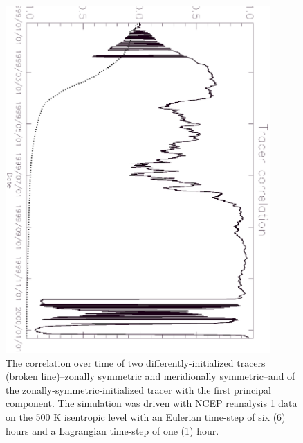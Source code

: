 \begin{figure}
\begin{center}
\includegraphics[angle=90,width=0.9\textwidth]{tcorr.eps}
\caption{The correlation over time of two differently-initialized tracers
(broken line)--zonally symmetric and meridionally symmetric--and of
the zonally-symmetric-initialized tracer with the first principal component.
The simulation was driven with NCEP reanalysis 1 data on the 500 K isentropic
level with an Eulerian time-step of six (6) hours and a Lagrangian time-step
of one (1) hour.}\label{tcorr}
\end{center}
\end{figure}

